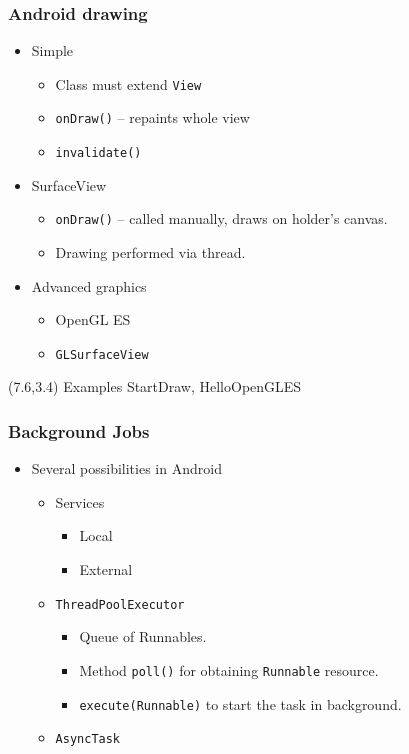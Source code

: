 \documentclass[10pt,xcolor=pdflatex]{beamer}
\begin{document}
\begin{frame}[fragile]\frametitle{Android drawing}
\begin{itemize}
  \item Simple
    \begin{itemize}
      \item Class must extend \texttt{View}
      \item \texttt{onDraw()} -- repaints whole view
      \item \texttt{invalidate()}
    \end{itemize}
  \item SurfaceView
    \begin{itemize}
      \item \texttt{onDraw()} -- called manually, draws on holder's canvas.
      \item Drawing performed via thread.
    \end{itemize}
  \item Advanced graphics
    \begin{itemize}
      \item OpenGL ES
      \item \texttt{GLSurfaceView}
    \end{itemize}
\end{itemize}
\begin{textblock}{15}(7.6,3.4)
    {\footnotesize Examples StartDraw, HelloOpenGLES}
\end{textblock}
\end{frame}


\begin{frame}[fragile]\frametitle{Background Jobs}
\begin{itemize}
	\item Several possibilities in Android
	  \begin{itemize}
		\item Services
          \begin{itemize}
            \item Local
	        \item External
          \end{itemize}
    	\item \texttt{ThreadPoolExecutor}
          \begin{itemize}
            \item Queue of Runnables.
	        \item Method \texttt{poll()} for obtaining \texttt{Runnable} resource.
	        \item \texttt{execute(Runnable)} to start the task in background.
          \end{itemize}
        \item \texttt{AsyncTask}
      \end{itemize}
\end{itemize}
\end{frame}
\end{document}
